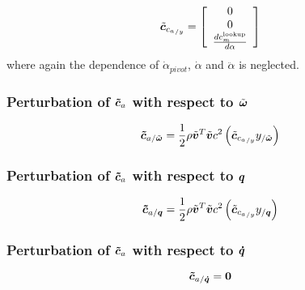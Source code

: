 \begin{equation}
\tilde{\bm{c}}_{{c_{a}}_{/y}} = \left[
	\begin{array}{cccc}
		0\\
		0\\
		\frac{ d c_m^{\text{lookup}}}{d \alpha} 
	\end{array} \right]
\end{equation}
where again the dependence of $\dot{\alpha}_{pivot}$, $\dot{\alpha}$ and $\ddot{\alpha}$ is 
neglected.
\subsubsection{Perturbation of $\bm{\tilde{c}}_a$ with respect to $\tilde{\bm{\omega}}$}
\begin{equation}
\bm{\tilde{c}}_{a/\tilde{\bm{\omega}}} = 
	\frac{1}{2} \rho \tilde{\bm{v}}^T \tilde{\bm{v}} c^2
	\left(  \tilde{\bm{c}}_{{c_{a}}_{/y}} y_{/\tilde{\bm{\omega}}}  \right) 
\end{equation}
\subsubsection{Perturbation of $\bm{\tilde{c}}_a$ with respect to $\bm{q}$}
\begin{equation}
\bm{\tilde{c}}_{a/\bm{q}} = 
	\frac{1}{2} \rho \tilde{\bm{v}}^T \tilde{\bm{v}} c^2
	\left(  \tilde{\bm{c}}_{{c_{a}}_{/y}} y_{/\bm{q}}  \right) 
\end{equation}
\subsubsection{Perturbation of $\bm{\tilde{c}}_a$ with respect to $\bm{\dot{q}}$}
\begin{equation}
\bm{\tilde{c}}_{a/\bm{\dot{q}}} = \bm{0}
\end{equation}

